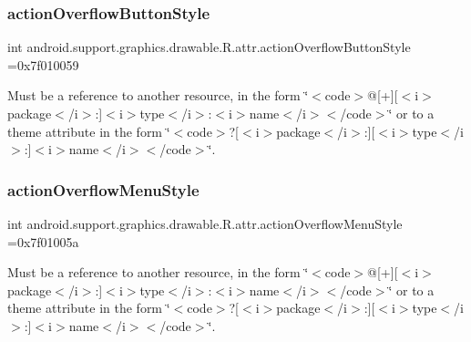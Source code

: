 \subsubsection{\texorpdfstring{action\+Overflow\+Button\+Style}{actionOverflowButtonStyle}}
{\footnotesize\ttfamily int android.\+support.\+graphics.\+drawable.\+R.\+attr.\+action\+Overflow\+Button\+Style =0x7f010059\hspace{0.3cm}{\ttfamily [static]}}

Must be a reference to another resource, in the form \char`\"{}$<$code$>$@\mbox{[}+\mbox{]}\mbox{[}$<$i$>$package$<$/i$>$\+:\mbox{]}$<$i$>$type$<$/i$>$\+:$<$i$>$name$<$/i$>$$<$/code$>$\char`\"{} or to a theme attribute in the form \char`\"{}$<$code$>$?\mbox{[}$<$i$>$package$<$/i$>$\+:\mbox{]}\mbox{[}$<$i$>$type$<$/i$>$\+:\mbox{]}$<$i$>$name$<$/i$>$$<$/code$>$\char`\"{}. \mbox{\label{classandroid_1_1support_1_1graphics_1_1drawable_1_1R_1_1attr_a33a3c5668cf4b4b2800828b4fc2c8bb8}} 
\subsubsection{\texorpdfstring{action\+Overflow\+Menu\+Style}{actionOverflowMenuStyle}}
{\footnotesize\ttfamily int android.\+support.\+graphics.\+drawable.\+R.\+attr.\+action\+Overflow\+Menu\+Style =0x7f01005a\hspace{0.3cm}{\ttfamily [static]}}

Must be a reference to another resource, in the form \char`\"{}$<$code$>$@\mbox{[}+\mbox{]}\mbox{[}$<$i$>$package$<$/i$>$\+:\mbox{]}$<$i$>$type$<$/i$>$\+:$<$i$>$name$<$/i$>$$<$/code$>$\char`\"{} or to a theme attribute in the form \char`\"{}$<$code$>$?\mbox{[}$<$i$>$package$<$/i$>$\+:\mbox{]}\mbox{[}$<$i$>$type$<$/i$>$\+:\mbox{]}$<$i$>$name$<$/i$>$$<$/code$>$\char`\"{}. \mbox{\label{classandroid_1_1support_1_1graphics_1_1drawable_1_1R_1_1attr_a4b5b41ce10cc0895eff07f8233681a57}} 
